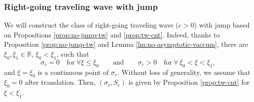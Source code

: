 \documentclass[12pt]{article}
\theoremstyle{definition}
\theoremstyle{remark}
\numberwithin{equation}{section}
\begin{document}



\subsubsection{Right-going traveling wave with jump}
\label{subsubsec:rg-jump-tw}

We will construct the class of right-going traveling wave ($ c > 0 $) with jump based on Propositions \ref{prop:no-jump-tw} and \ref{prop:tw-cnt}. Indeed, thanks to Proposition \ref{prop:no-jump-tw} and Lemma \ref{lm:no-asymptotic-vaccum}, there are $\xi_0, \xi_1 \in \mathbb R$, $ \xi_0 < \xi_1 $,  such that
\begin{equation}
    \label{jm-tw-001}
    \sigma_c = 0 \quad \text{for} \ \forall \xi \leq \xi_0 \qquad \text{and} \qquad \sigma_c > 0 \quad \text{for} \ \forall \ \xi_0 < \xi < \xi_1,
\end{equation}
and $ \xi= \xi_0 $ is a continuous point of $ \sigma_c $. Without loss of generality, we assume that $ \xi_0 = 0 $ after translation. Then, $ (\sigma_c,S_c) $ is given by Proposition \ref{prop:tw-cnt} for $ \xi < \xi_1 $. 
\end{document}

